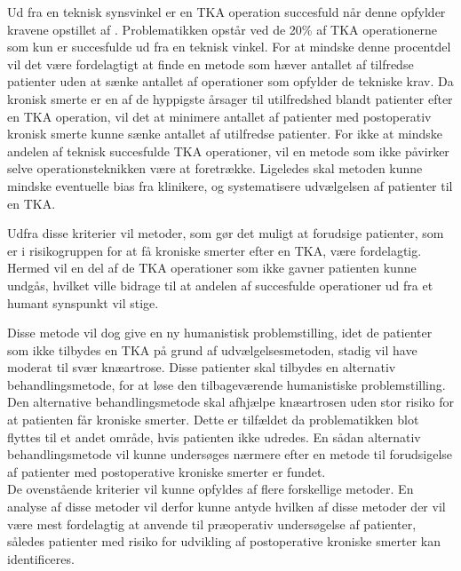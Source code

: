 Ud fra en teknisk synsvinkel er en TKA operation succesfuld når denne opfylder kravene opstillet af \cite{aarsrapport2016}. Problematikken opstår ved de 20\% af TKA operationerne som kun er succesfulde ud fra en teknisk vinkel. For at mindske denne procentdel vil det være fordelagtigt at finde en metode som hæver antallet af tilfredse patienter uden at sænke antallet af operationer som opfylder de tekniske krav. Da kronisk smerte er en af de hyppigste årsager til utilfredshed blandt patienter efter en TKA operation, vil det at minimere antallet af patienter med postoperativ kronisk smerte kunne sænke antallet af utilfredse patienter. \citep{Bourne2010} For ikke at mindske andelen af teknisk succesfulde TKA operationer, vil en metode som ikke påvirker selve operationsteknikken være at foretrække. Ligeledes skal metoden kunne mindske eventuelle bias fra klinikere, og systematisere udvælgelsen af patienter til en TKA. 

Udfra disse kriterier vil metoder, som gør det muligt at forudsige patienter, som er i risikogruppen for at få kroniske smerter efter en TKA, være fordelagtig. Hermed vil en del af de TKA operationer som ikke gavner patienten kunne undgås, hvilket ville bidrage til at andelen af succesfulde operationer ud fra et humant synspunkt vil stige.

Disse metode vil dog give en ny humanistisk problemstilling, idet de patienter som ikke tilbydes en TKA på grund af udvælgelsesmetoden, stadig vil have moderat til svær knæartrose. Disse patienter skal tilbydes en alternativ behandlingsmetode, for at løse den tilbageværende humanistiske problemstilling. Den alternative behandlingsmetode skal afhjælpe knæartrosen uden stor risiko for at patienten får kroniske smerter. Dette er tilfældet da problematikken blot flyttes til et andet område, hvis patienten ikke udredes. En sådan alternativ behandlingsmetode vil kunne undersøges nærmere efter en metode til forudsigelse af patienter med postoperative kroniske smerter er fundet. \\  
De ovenstående kriterier vil kunne opfyldes af flere forskellige metoder. En analyse af disse metoder vil derfor kunne antyde hvilken af disse metoder der vil være mest fordelagtig at anvende til præoperativ undersøgelse af patienter, således patienter med risiko for udvikling af postoperative kroniske smerter kan identificeres.        

